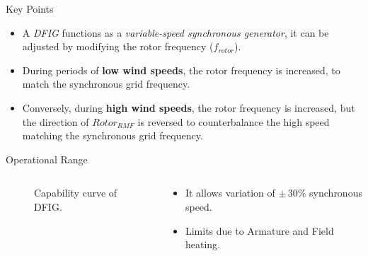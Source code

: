 \documentclass{beamer}
\begin{document}
\begin{frame}{Key Points}
\begin{itemize}
    
    \item A \textit{DFIG} functions as a \textit{variable-speed synchronous generator}, it can be adjusted by modifying the rotor frequency ($f_{\textit{rotor}}$).

    \item During periods of \textbf{low wind speeds}, the rotor frequency is increased, to match the synchronous grid frequency.

    \item Conversely, during \textbf{high wind speeds}, the rotor frequency is increased, but the direction of $Rotor_{RMF}$ is reversed to counterbalance the high speed matching the synchronous grid frequency. 

\end{itemize}
\end{frame}



\begin{frame}{Operational Range}
 \begin{columns}
\begin{column}{0.5\textwidth} 
    \begin{figure}
        \centering
        \caption{Capability curve of DFIG.}
    \end{figure}
    \end{column}
    
    \begin{column}{0.4\textwidth} %
      \begin{itemize}
        \item It allows variation of $\pm \,30\%$ synchronous speed.

        \item Limits due to Armature and Field heating.
    
      \end{itemize}
    \end{column}
  \end{columns}
\end{frame}
\end{document}
